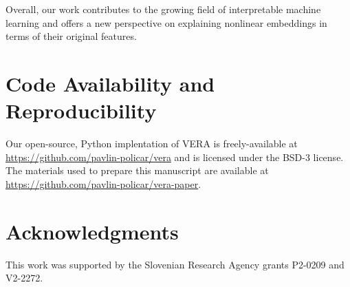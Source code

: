 \documentclass[lettersize,journal]{IEEEtran}
\begin{document}
Overall, our work contributes to the growing field of interpretable machine learning and offers a new perspective on explaining nonlinear embeddings in terms of their original features.


\section*{Code Availability and Reproducibility}

Our open-source, Python implentation of VERA is freely-available at \url{https://github.com/pavlin-policar/vera} and is licensed under the BSD-3 license. The materials used to prepare this manuscript are available at \url{https://github.com/pavlin-policar/vera-paper}.


\section*{Acknowledgments}
This work was supported by the Slovenian Research Agency grants P2-0209 and V2-2272.
 
%




 




\end{document}
